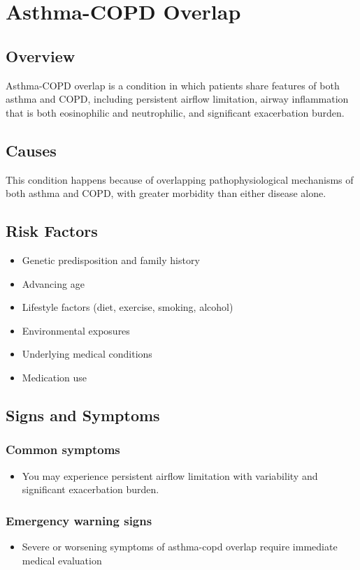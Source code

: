 \chapter{Asthma-COPD Overlap}
\label{sec:Asthma-COPD Overlap}

\section{Overview}
Asthma-COPD overlap is a condition in which patients share features of both asthma and COPD, including persistent airflow limitation, airway inflammation that is both eosinophilic and neutrophilic, and significant exacerbation burden.
\section{Causes}
This condition happens because of overlapping pathophysiological mechanisms of both asthma and COPD, with greater morbidity than either disease alone.     
\section{Risk Factors}

\begin{itemize}[noitemsep]
  \item Genetic predisposition and family history
  \item Advancing age
  \item Lifestyle factors (diet, exercise, smoking, alcohol)
  \item Environmental exposures
  \item Underlying medical conditions
  \item Medication use
\end{itemize}
\section{Signs and Symptoms}

\subsection{Common symptoms}
\begin{itemize}[noitemsep]
  \item You may experience persistent airflow limitation with variability and significant exacerbation burden. 
  \end{itemize}

\subsection{Emergency warning signs}
\begin{itemize}[noitemsep]
  \item Severe or worsening symptoms of asthma-copd overlap require immediate medical evaluation
\end{itemize}
